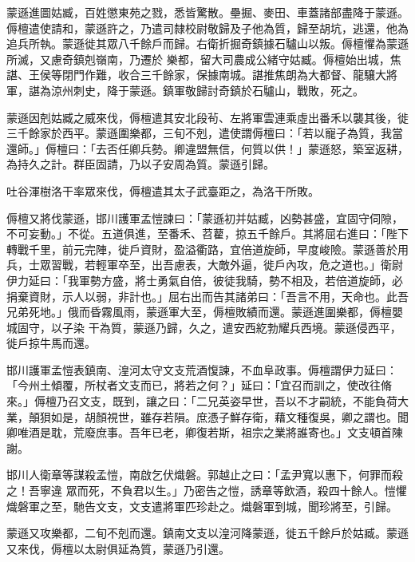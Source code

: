 \begin{pinyinscope}
 蒙遜進圖姑臧，百姓懲東苑之戮，悉皆驚散。壘掘、麥田、車蓋諸部盡降于蒙遜。傉檀遣使請和，蒙遜許之，乃遣司隸校尉敬歸及子他為質，歸至胡坑，逃還，他為追兵所執。蒙遜徙其眾八千餘戶而歸。右衛折掘奇鎮據石驢山以叛。傉檀懼為蒙遜所滅，又慮奇鎮剋嶺南，乃遷於
 樂都，留大司農成公緒守姑臧。傉檀始出城，焦諶、王侯等閉門作難，收合三千餘家，保據南城。諶推焦朗為大都督、龍驤大將軍，諶為涼州刺史，降于蒙遜。鎮軍敬歸討奇鎮於石驢山，戰敗，死之。



 蒙遜因剋姑臧之威來伐，傉檀遣其安北段茍、左將軍雲連乘虛出番禾以襲其後，徙三千餘家於西平。蒙遜圍樂都，三旬不剋，遣使謂傉檀曰：「若以寵子為質，我當還師。」傉檀曰：「去否任卿兵勢。卿違盟無信，何質以供！」蒙遜怒，築室返耕，為持久之計。群臣固請，乃以子安周為質。蒙遜引歸。



 吐谷渾樹洛干率眾來伐，傉檀遣其太子武臺距之，為洛干所敗。



 傉檀又將伐蒙遜，邯川護軍孟愷諫曰：「蒙遜初并姑臧，凶勢甚盛，宜固守伺隙，不可妄動。」不從。五道俱進，至番禾、苕藋，掠五千餘戶。其將屈右進曰：「陛下轉戰千里，前元完陣，徙戶資財，盈溢衢路，宜倍道旋師，早度峻險。蒙遜善於用兵，士眾習戰，若輕軍卒至，出吾慮表，大敵外逼，徙戶內攻，危之道也。」衛尉伊力延曰：「我軍勢方盛，將士勇氣自倍，彼徒我騎，勢不相及，若倍道旋師，必捐棄資財，示人以弱，非計也。」屈右出而告其諸弟曰：「吾言不用，天命也。此吾兄弟死地。」俄而昏霧風雨，蒙遜軍大至，傉檀敗績而還。蒙遜進圍樂都，傉檀嬰城固守，以子染
 干為質，蒙遜乃歸，久之，遣安西紇勃耀兵西境。蒙遜侵西平，徙戶掠牛馬而還。



 邯川護軍孟愷表鎮南、湟河太守文支荒酒愎諫，不血阜政事。傉檀謂伊力延曰：「今州土傾覆，所杖者文支而已，將若之何？」延曰：「宜召而訓之，使改往脩來。」傉檀乃召文支，既到，讓之曰：「二兄英姿早世，吾以不才嗣統，不能負荷大業，顛狽如是，胡顏視世，雖存若隕。庶憑子鮮存衛，藉文種復吳，卿之謂也。聞卿唯酒是耽，荒廢庶事。吾年已老，卿復若斯，祖宗之業將誰寄也。」文支頓首陳謝。



 邯川人衛章等謀殺孟愷，南啟乞伏熾磐。郭越止之曰：「孟尹寬以惠下，何罪而殺之！吾寧違
 眾而死，不負君以生。」乃密告之愷，誘章等飲酒，殺四十餘人。愷懼熾磐軍之至，馳告文支，文支遣將軍匹珍赴之。熾磐軍到城，聞珍將至，引歸。



 蒙遜又攻樂都，二旬不剋而還。鎮南文支以湟河降蒙遜，徙五千餘戶於姑臧。蒙遜又來伐，傉檀以太尉俱延為質，蒙遜乃引還。




\end{pinyinscope}
